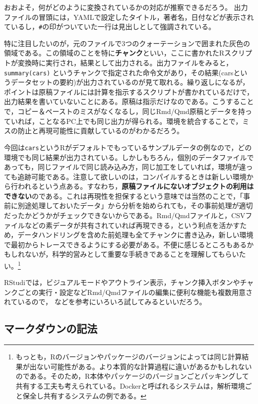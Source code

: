 \documentclass[
  a4paper,
]{ltjsbook}
\begin{document}
おおよそ，何がどのように変換されているかの対応が推察できるだろう。
出力ファイルの冒頭には，YAMLで設定したタイトル，著者名，日付などが表示されているし，\texttt{\#}の印がついていた一行は見出しとして強調されている。

特に注目したいのが，元のファイルで3つのクォーテーションで囲まれた灰色の領域である。この領域のことを特に\textbf{チャンク}といい，ここに書かれたRスクリプトが変換時に実行され，結果として出力される。出力ファイルをみると，\texttt{summary(cars)}
というチャンクで指定された命令文があり，その結果(carsというデータセットの要約)が出力されているのが見て取れる。繰り返しになるが，ポイントは原稿ファイルには計算を指示するスクリプトが書かれているだけで，出力結果を書いていないことにある。原稿は指示だけなのである。こうすることで，コピー＆ペーストのミスがなくなるし，同じRmd/Qmd原稿とデータを持っていれば，ことなるPC上でも同じ出力が得られる。環境を統合することで，ミスの防止と再現可能性に貢献しているのがわかるだろう。

今回は\texttt{cars}というRがデフォルトでもっているサンプルデータの例なので，どの環境でも同じ結果が出力されている。しかしもちろん，個別のデータファイルであっても，同じファイルで同じ読み込み方，同じ加工をしていれば，環境が違っても追跡可能である。注意して欲しいのは，コンパイルするときは新しい環境から行われるという点ある。すなわち，\textbf{原稿ファイルにないオブジェクトの利用はできない}のである。これは再現性を担保するという意味では当然のことで，「事前に別途処理しておいたデータ」から分析を始められても，その事前処理が適切だったかどうかがチェックできないからである。Rmd/Qmdファイルと，CSVファイルなどの素データが共有されていれば再現できる，という利点を活かすため，データハンドリングを含めた前処理も全てチャンクに書き込み，新しい環境で最初からトレースできるようにする必要がある。不便に感じるところもあるかもしれないが，科学的営みとして重要な手続きであることを理解してもらいたい。\footnote{もっとも，Rのバージョンやパッケージのバージョンによっては同じ計算結果が出ない可能性がある。より本質的な計算過程に違いがあるかもしれないのである。そのため，R本体やパッケージのバージョンごとパッキングして共有する工夫も考えられている。Dockerと呼ばれるシステムは，解析環境ごと保全し共有するシステムの例である。}

RStudiでは，ビジュアルモードやアウトライン表示，チャンク挿入ボタンやチャンクごとの実行・設定などRmd/Qmdファイルの編集に便利な機能も複数用意されているので，
\textcite{Takahashi201805} などを参考にいろいろ試してみるといいだろう。

\subsection{マークダウンの記法}\label{ux30deux30fcux30afux30c0ux30a6ux30f3ux306eux8a18ux6cd5}
\end{document}
